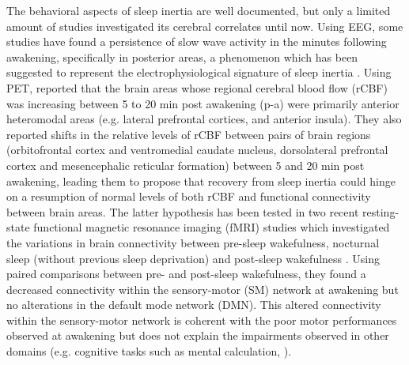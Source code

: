 The behavioral aspects of sleep inertia are well documented, but only a limited amount of studies investigated its cerebral correlates until now. Using EEG, some studies have found a persistence of slow wave activity in the minutes following awakening, specifically in posterior areas, a phenomenon which has been suggested to represent the electrophysiological signature of sleep inertia \citep{ogilvie_falling_1992, ferrara_electroencephalographic_2006, marzano_recalling_2011, gorgoni_eeg_2015}. Using PET, \citet{balkin_process_2002} reported that the brain areas whose regional cerebral blood flow (rCBF) was increasing between 5 to 20 min post awakening (p-a) were primarily anterior heteromodal areas (e.g. lateral prefrontal cortices, and anterior insula). They also reported shifts in the relative levels of rCBF between pairs of brain regions (orbitofrontal cortex and ventromedial caudate nucleus, dorsolateral prefrontal cortex and mesencephalic reticular formation) between 5 and 20 min post awakening, leading them to propose that recovery from sleep inertia could hinge on a resumption of normal levels of both rCBF and functional connectivity between brain areas. The latter hypothesis has been tested in two recent resting-state functional magnetic resonance imaging (fMRI) studies which investigated the variations in brain connectivity between pre-sleep wakefulness, nocturnal sleep (without previous sleep deprivation) and post-sleep wakefulness \citep{wu_variations_2012, tsai_local_2014}. Using paired comparisons between pre- and post-sleep wakefulness, they found a decreased connectivity within the sensory-motor (SM) network at awakening but no alterations in the default mode network (DMN). This altered connectivity within the sensory-motor network is coherent with the poor motor performances observed at awakening but does not explain the impairments observed in other domains (e.g. cognitive tasks such as mental calculation, \citealp{tassi_sleep_2000, trotti_waking_2016}).

